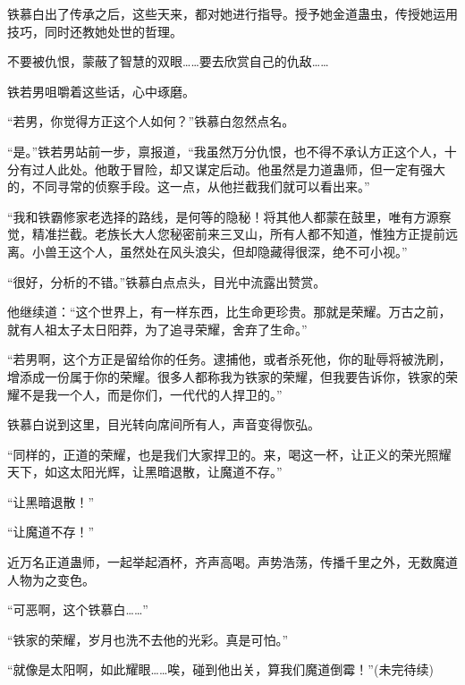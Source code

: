 \begin{this_body}
铁慕白出了传承之后，这些天来，都对她进行指导。授予她金道蛊虫，传授她运用技巧，同时还教她处世的哲理。

不要被仇恨，蒙蔽了智慧的双眼……要去欣赏自己的仇敌……

铁若男咀嚼着这些话，心中琢磨。

“若男，你觉得方正这个人如何？”铁慕白忽然点名。

“是。”铁若男站前一步，禀报道，“我虽然万分仇恨，也不得不承认方正这个人，十分有过人此处。他敢于冒险，却又谋定后动。他虽然是力道蛊师，但一定有强大的，不同寻常的侦察手段。这一点，从他拦截我们就可以看出来。”

“我和铁霸修家老选择的路线，是何等的隐秘！将其他人都蒙在鼓里，唯有方源察觉，精准拦截。老族长大人您秘密前来三叉山，所有人都不知道，惟独方正提前远离。小兽王这个人，虽然处在风头浪尖，但却隐藏得很深，绝不可小视。”

“很好，分析的不错。”铁慕白点点头，目光中流露出赞赏。

他继续道：“这个世界上，有一样东西，比生命更珍贵。那就是荣耀。万古之前，就有人祖太子太日阳莽，为了追寻荣耀，舍弃了生命。”

“若男啊，这个方正是留给你的任务。逮捕他，或者杀死他，你的耻辱将被洗刷，增添成一份属于你的荣耀。很多人都称我为铁家的荣耀，但我要告诉你，铁家的荣耀不是我一个人，而是你们，一代代的人捍卫的。”

铁慕白说到这里，目光转向席间所有人，声音变得恢弘。

“同样的，正道的荣耀，也是我们大家捍卫的。来，喝这一杯，让正义的荣光照耀天下，如这太阳光辉，让黑暗退散，让魔道不存。”

“让黑暗退散！”

“让魔道不存！”

近万名正道蛊师，一起举起酒杯，齐声高喝。声势浩荡，传播千里之外，无数魔道人物为之变色。

“可恶啊，这个铁慕白……”

“铁家的荣耀，岁月也洗不去他的光彩。真是可怕。”

“就像是太阳啊，如此耀眼……唉，碰到他出关，算我们魔道倒霉！”(未完待续)

\end{this_body}

